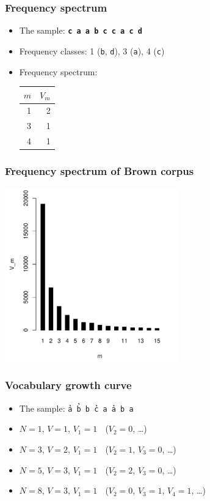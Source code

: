 \documentclass[t]{beamer} %
\begin{document}
\begin{frame}
\frametitle{Frequency spectrum}

  \begin{itemize}
  \item The sample:  \texttt{\textbf{c a a b c c a c d}}
  \item Frequency classes: 1 (\texttt{b}, \texttt{d}), 3 (\texttt{a}), 4 (\texttt{c})
  \item Frequency spectrum:
    \begin{center}
      \begin{tabular}{r|r}
        $m$ & $V_m$\\
        \hline
        1 & 2\\
        3 & 1\\
        4 & 1
      \end{tabular}
    \end{center}
  \end{itemize}
\end{frame}

\begin{frame}
  \frametitle{Frequency spectrum of Brown corpus}
   
  \ungap
  \begin{center}
    \includegraphics[height=7.5cm]{img/brown-spc}
  \end{center}
\end{frame}

\begin{frame}
 \frametitle{Vocabulary growth curve}

  \begin{itemize}
  \item<1-> The sample: \texttt{\h<2->{a} \h<3->{b b} \h<4->{c a} \h<5->{a b a}}
  \item<2-> $N = 1$, $V = 1$, $V_1 = 1$ $\;$ ($V_2 = 0$, \ldots)
  \item<3-> $N = 3$, $V = 2$, $V_1 = 1$ $\;$ ($V_2 = 1$, $V_3 = 0$, \ldots)
  \item<4-> $N = 5$, $V = 3$, $V_1 = 1$ $\;$ ($V_2 = 2$, $V_3 = 0$, \ldots)
  \item<5-> $N = 8$, $V = 3$, $V_1 = 1$ $\;$ ($V_2 = 0$, $V_3 = 1$, $V_4 = 1$, \ldots)
  \end{itemize}
\end{frame}
\end{document}
